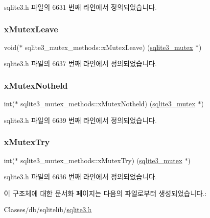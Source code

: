 sqlite3.\+h 파일의 6631 번째 라인에서 정의되었습니다.

\mbox{\label{structsqlite3__mutex__methods_a0d4ef78481d18de5f9346f80321a17b1}} 
\subsubsection{\texorpdfstring{x\+Mutex\+Leave}{xMutexLeave}}
{\footnotesize\ttfamily void($\ast$ sqlite3\+\_\+mutex\+\_\+methods\+::x\+Mutex\+Leave) (\hyperlink{sqlite3_8h_a0f546860bde03fddb33a9fed920da05c}{sqlite3\+\_\+mutex} $\ast$)}



sqlite3.\+h 파일의 6637 번째 라인에서 정의되었습니다.

\mbox{\label{structsqlite3__mutex__methods_a5b7c9daa7aea5f01ef9fa58f6d1c5cb1}} 
\subsubsection{\texorpdfstring{x\+Mutex\+Notheld}{xMutexNotheld}}
{\footnotesize\ttfamily int($\ast$ sqlite3\+\_\+mutex\+\_\+methods\+::x\+Mutex\+Notheld) (\hyperlink{sqlite3_8h_a0f546860bde03fddb33a9fed920da05c}{sqlite3\+\_\+mutex} $\ast$)}



sqlite3.\+h 파일의 6639 번째 라인에서 정의되었습니다.

\mbox{\label{structsqlite3__mutex__methods_aa65a38cee32246dc3257a80ce47be5fe}} 
\subsubsection{\texorpdfstring{x\+Mutex\+Try}{xMutexTry}}
{\footnotesize\ttfamily int($\ast$ sqlite3\+\_\+mutex\+\_\+methods\+::x\+Mutex\+Try) (\hyperlink{sqlite3_8h_a0f546860bde03fddb33a9fed920da05c}{sqlite3\+\_\+mutex} $\ast$)}



sqlite3.\+h 파일의 6636 번째 라인에서 정의되었습니다.



이 구조체에 대한 문서화 페이지는 다음의 파일로부터 생성되었습니다.\+:\begin{DoxyCompactItemize}
\item 
Classes/db/sqlitelib/\hyperlink{sqlite3_8h}{sqlite3.\+h}\end{DoxyCompactItemize}
